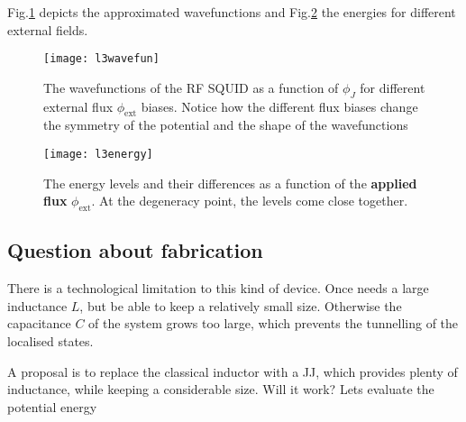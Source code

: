 \noindent Fig.\ref{fig:l3wavefun} depicts the approximated wavefunctions
and Fig.\ref{fig:l3energy} the energies for different external fields.

\begin{figure}[h]
  \centering \texttt{[image: l3wavefun]}
  \caption{The wavefunctions of  the RF SQUID as a  function of $\phi_J$
    for different  external flux  $\phi_\text{ext}$ biases.   Notice how
    the different flux  biases change the symmetry of  the potential and
    the shape of the wavefunctions}
  \label{fig:l3wavefun}
\end{figure}

\begin{figure}[h]
  \begin{center}
    \texttt{[image: l3energy]}
    \caption{\small  The  energy  levels  and  their  differences  as  a
      function of  the \textbf{applied flux} $\phi_\text{ext}$.   At the
      degeneracy      point,       the      levels       come      close
      together.\label{fig:l3energy}}
  \end{center}
\end{figure}

\newpage

 \subsection{Question about fabrication}
 There is a technological limitation to  this kind of device. Once needs
 a  large  inductance $L$,  but  be  able  to  keep a  relatively  small
 size. Otherwise  the capacitance $ C  $ of the system  grows too large,
 which prevents the tunnelling of the localised states.

 A  proposal is  to  replace the  classical inductor  with  a JJ,  which
 provides plenty of inductance, while keeping a considerable size.  Will
 it work?  Lets evaluate the potential energy

